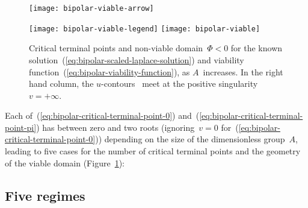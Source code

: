 \begin{figure}
  \centering
  \begin{minipage}[b]{0.1\textwidth}
    \texttt{[image: bipolar-viable-arrow]}
  \end{minipage}
  \begin{minipage}[b]{0.8\textwidth}
    \newcommand*{\legendtrimwidth}{0.03\textwidth}
    \newcommand*{\legendoffsetheight}{0.025\textwidth}
    \texttt{[image: bipolar-viable-legend]}
    \texttt{[image: bipolar-viable]}
  \end{minipage}
  \caption{
    Critical terminal points and non-viable domain~$\Phi < 0$
    for the known solution~(\ref{eq:bipolar-scaled-laplace-solution})
    and viability function~(\ref{eq:bipolar-viability-function}),
    as $A$~increases.
    In the right hand column,
    the $u$-contours~ meet
    at the positive singularity~$v = +\infty$.
  }
  \label{fig:bipolar-viable}
\end{figure}

Each of~(\ref{eq:bipolar-critical-terminal-point-0})
and~(\ref{eq:bipolar-critical-terminal-point-pi})
has between zero and two roots
(ignoring~$v = 0$ for~(\ref{eq:bipolar-critical-terminal-point-0}))
depending on the size of the dimensionless group~$A$,
leading to five cases for the number of critical terminal points
and the geometry of the viable domain
(Figure~\ref{fig:bipolar-viable}):

\subsection{Five regimes}
\label{sec:bipolar.viable.regimes}


